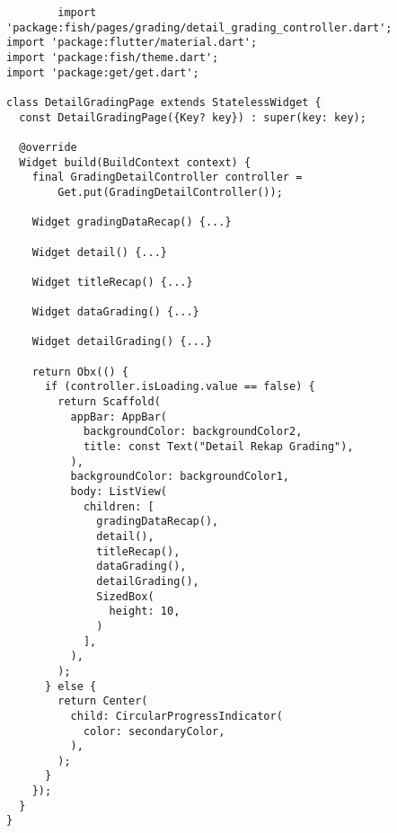 	\begin{lstlisting}
	    import 'package:fish/pages/grading/detail_grading_controller.dart';
import 'package:flutter/material.dart';
import 'package:fish/theme.dart';
import 'package:get/get.dart';

class DetailGradingPage extends StatelessWidget {
  const DetailGradingPage({Key? key}) : super(key: key);

  @override
  Widget build(BuildContext context) {
    final GradingDetailController controller =
        Get.put(GradingDetailController());

    Widget gradingDataRecap() {...}

    Widget detail() {...}

    Widget titleRecap() {...}

    Widget dataGrading() {...}

    Widget detailGrading() {...}

    return Obx(() {
      if (controller.isLoading.value == false) {
        return Scaffold(
          appBar: AppBar(
            backgroundColor: backgroundColor2,
            title: const Text("Detail Rekap Grading"),
          ),
          backgroundColor: backgroundColor1,
          body: ListView(
            children: [
              gradingDataRecap(),
              detail(),
              titleRecap(),
              dataGrading(),
              detailGrading(),
              SizedBox(
                height: 10,
              )
            ],
          ),
        );
      } else {
        return Center(
          child: CircularProgressIndicator(
            color: secondaryColor,
          ),
        );
      }
    });
  }
}

	\end{lstlisting}

